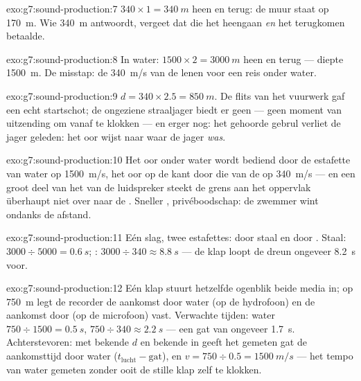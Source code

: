 \begin{solution}{exo:g7:sound-production:7}
$340 \times 1 = \qty{340}{m}$ heen en terug: de muur staat op
\qty{170}{m}. Wie \qty{340}{m} antwoordt, vergeet dat die  het
heengaan \emph{en} het terugkomen betaalde.
\end{solution}

\begin{solution}{exo:g7:sound-production:8}
In water: $1500 \times 2 = \qty{3000}{m}$ heen en terug --- diepte
\qty{1500}{m}. De misstap: de \qty{340}{m/s} van de  lenen
voor een reis onder water.
\end{solution}

\begin{solution}{exo:g7:sound-production:9}
$d = 340 \times 2.5 = \qty{850}{m}$. De flits van het vuurwerk gaf een
echt startschot; de ongeziene straaljager biedt er geen --- geen moment
van uitzending om vanaf te klokken --- en erger nog: het gehoorde
gebrul verliet de jager  geleden: het oor wijst naar waar de
jager \emph{was}.
\end{solution}

\begin{solution}{exo:g7:sound-production:10}
Het oor onder water wordt bediend door de estafette van water op
\qty{1500}{m/s}, het oor op de kant door die van de  op
\qty{340}{m/s} --- en een groot deel van het  van de
luidspreker steekt de grens aan het oppervlak überhaupt niet over naar
de . Sneller , privéboodschap: de zwemmer wint
ondanks de afstand.
\end{solution}

\begin{solution}{exo:g7:sound-production:11}
Eén slag, twee estafettes: door staal en door . Staal:
$3000 \div 5000 = \qty{0.6}{s}$; : $3000 \div 340 \approx
\qty{8.8}{s}$ --- de klap loopt de dreun ongeveer \qty{8.2}{s} voor.
\end{solution}

\begin{solution}{exo:g7:sound-production:12}
Eén klap stuurt hetzelfde ogenblik beide media in; op \qty{750}{m} legt
de recorder de aankomst door water (op de hydrofoon) en de aankomst
door  (op de microfoon) vast. Verwachte tijden: water $750
\div 1500 = \qty{0.5}{s}$,  $750 \div 340 \approx
\qty{2.2}{s}$ --- een gat van ongeveer \qty{1.7}{s}. Achterstevoren:
met bekende $d$ en bekende  in  geeft het
gemeten gat de aankomsttijd door water ($t_{\text{lucht}} -
\text{gat}$), en $v = 750 \div 0.5 = \qty{1500}{m/s}$ --- het tempo van
water gemeten zonder ooit de stille klap zelf te klokken.
\end{solution}

